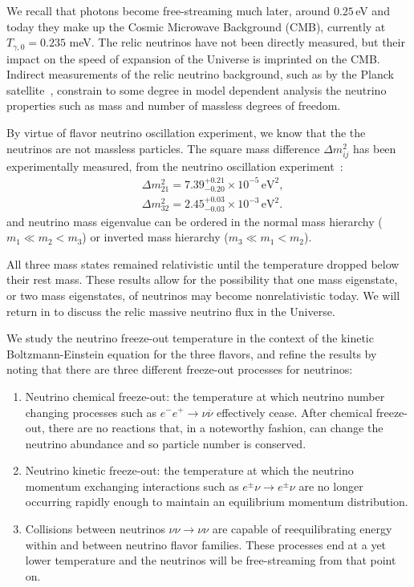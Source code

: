 We recall that photons become free-streaming much later, around $0.25$\,eV and today they make up the Cosmic Microwave Background (CMB), currently at $T_{\gamma,0}=0.235$ meV. The relic neutrinos have not been directly measured, but their impact on the speed of expansion of the Universe is imprinted on the CMB. Indirect measurements of the relic neutrino background, such as by the Planck satellite~\cite{Planck:2018vyg,Planck:2015fie,Planck:2013pxb}, constrain to some degree in model dependent analysis the neutrino properties such as mass and number of massless degrees of freedom.

By virtue of flavor  neutrino oscillation experiment, we know that the the neutrinos are not massless particles.  The square mass difference $\Delta m^2_{ij}$ has been experimentally measured, from the neutrino oscillation experiment~\cite{ParticleDataGroup:2022pth}:
\begin{align}
&\Delta{m}_{21}^2=7.39^{+0.21}_{-0.20}\times10^{-5}\,\mathrm{eV}^2,\\
&\Delta{m}_{32}^2=2.45^{+0.03}_{-0.03}\times10^{-3}\,\mathrm{eV}^2.
\end{align}
and neutrino mass eigenvalue can be ordered in the normal mass hierarchy ($m_1\ll m_2<m_3$) or inverted mass hierarchy ($m_3\ll m_1<m_2$). 

All three mass states remained relativistic until the temperature dropped below their rest mass. These results allow for the possibility that one mass eigenstate, or two mass eigenstates, of neutrinos may become nonrelativistic today. We will return in  to discuss the relic massive neutrino flux in the Universe.


We study the neutrino freeze-out temperature in the context of the kinetic Boltzmann-Einstein equation for the three flavors, and refine the results by noting that there are three different freeze-out processes for neutrinos:
\begin{enumerate}
\item Neutrino chemical freeze-out: the temperature at which neutrino number changing processes such as $e^-e^+\to\nu\overline\nu$ effectively cease. After chemical freeze-out, there are no reactions that, in a noteworthy fashion, can change the neutrino abundance and so particle number is conserved.
%
\item Neutrino kinetic freeze-out: the temperature at which the neutrino momentum exchanging interactions such as $e^\pm\nu\to e^\pm\nu$ are no longer occurring rapidly enough to maintain an equilibrium momentum distribution. 
%
\item Collisions between neutrinos $\nu\nu\to\nu\nu$ are capable of reequilibrating energy within and between neutrino flavor families. These processes end at a yet lower temperature and the neutrinos will be free-streaming from that point on.
\end{enumerate}

